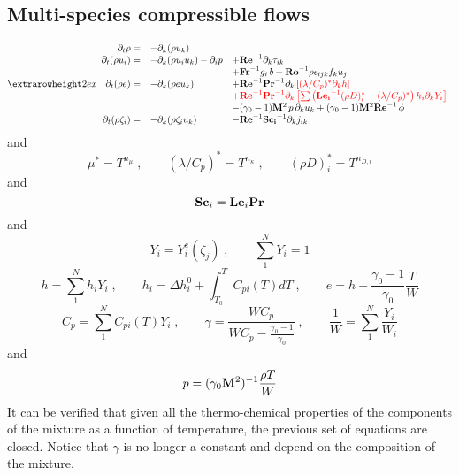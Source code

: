 \subsection{Multi-species compressible flows}

\begin{equation}
\setlength{\extrarowheight}{2ex}
\begin{array}{rll}
  \partial_t \rho =&
  -\partial_k (\rho u_k)  & \\
  \partial_t (\rho u_i) =& 
  -\partial_k (\rho u_i u_k )-\partial_i p  &
  +\mathrm{\bf Re}^{-1}\partial_k \tau_{ik} \\
  & & +\mathrm{\bf Fr}^{-1} g_i\,b+\mathrm{\bf Ro}^{-1}\rho\epsilon_{ijk} f_ku_j  \\
  \partial_t (\rho e) =& 
  -\partial_k (\rho e u_k ) &
  +\mathrm{\bf Re}^{-1}\mathrm{\bf Pr}^{-1} \partial_k \left[\color{red}{(\lambda/C_p)^{*} \partial_k h}\right] \\
  & & \color{red}{+\mathrm{\bf Re}^{-1}\mathrm{\bf Pr}^{-1} \partial_k\left[\sum\left(\mathrm{\bf Le_i}^{-1}(\rho D)_i^*-
  (\lambda/C_p)^*\right)h_i \partial_k Y_i\right]} \\
  & &-(\gamma_0-1)\mathrm{\bf M}^2\,p\, \partial_k u_k  + (\gamma_0-1)\mathrm{\bf M}^2\mathrm{\bf Re}^{-1}\,\phi \\
  \partial_t (\rho \zeta_i)=&
  -\partial_k (\rho \zeta_i u_k) &
  - \mathrm{\bf Re}^{-1}\mathrm{\bf Sc_i}^{-1} \partial_k j_{ik}
\end{array}
\end{equation}
and
\begin{equation}
  \mu^{*} = T^{n_\mu}\;,\qquad (\lambda/C_p)^{*} = T^{n_\kappa} \;,\qquad (\rho
  D)_i^{*} = T^{n_{D,i}}
\end{equation}
and 
\begin{equation}
\mathrm{\bf Sc}_i = \mathrm{\bf Le}_i \mathrm{\bf Pr}
\end{equation}
and 
\begin{equation}
  Y_i = Y^e_i(\zeta_j)\;, \qquad \sum^N_1 Y_i=1 
\end{equation}
\begin{equation}
  h = \sum^N_1 h_{i} Y_i \;,\qquad h_{i} = \Delta h^0_i + \int^{T}_{T_0}
  C_{pi}(T) dT\;,\qquad e = h - \frac{\gamma_0-1}{\gamma_0}\frac{T}{W} 
\end{equation}
\begin{equation}
  C_p = \sum^N_1 C_{pi}(T) Y_i\;,\qquad
  \gamma = \frac{W C_p}{W C_p-\frac{\gamma_0-1}{\gamma_0}} \;,\qquad
  \frac{1}{W} = \sum^N_1 \frac{Y_i}{W_i} 
\end{equation}
and
\begin{equation}
  p = (\gamma_0 \mathrm{\bf M}^2)^{-1} \frac{\rho T}{W} 
\end{equation}
It can be verified that given all the thermo-chemical properties of the
components of the mixture as a function of temperature, the previous set of
equations are closed. Notice that $\gamma$ is no longer a constant and depend on
the composition of the mixture.

